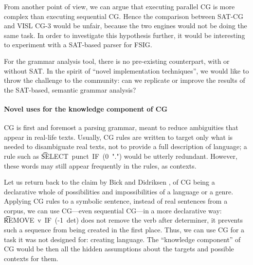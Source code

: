 From another point of view, we can argue that executing parallel CG is more complex than executing sequential CG.
Hence the comparison between SAT-CG and VISL CG-3 would be unfair, because the two 
engines would not be doing the same task. In order to investigate this hypothesis further, it would be interesting to experiment with a SAT-based parser for FSIG.

For the grammar analysis tool, there is no pre-existing counterpart, with or without SAT. 
In the spirit of ``novel implementation techniques'', we would like to throw the challenge to the community: can we replicate or improve the results of the SAT-based,
semantic grammar analysis? 

\paragraph{Novel uses for the knowledge component of CG} 

CG is first and foremost a parsing grammar, meant to reduce ambiguities that appear in real-life texts. 
Usually, CG rules are written to target only what is needed to disambiguate real texts, not to provide a full description of language;  
a rule such as \t{SELECT~punct~IF~(0~".")} would be utterly redundant. However, these words may still appear frequently in the rules, as contexts. 

Let us return back to the claim by Bick and Didriksen \cite{bick2015}, of CG being a declarative whole of possibilities and impossibilities of a language or a genre. 
Applying CG rules to a symbolic sentence, instead of real sentences from a corpus, 
we can use CG---even sequential CG---in a more declarative way: \t{REMOVE~v~IF~(-1~det)} does not remove the 
verb after determiner, it prevents such a sequence from being created in the first place. 
Thus, we can use CG for a task it was not designed for: creating language.
The ``knowledge component'' of CG would be then all the hidden assumptions 
about the targets and possible contexts for them.

